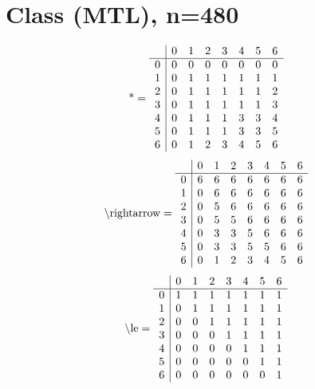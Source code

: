 \documentclass[11pt]{article}
\begin{document}
\section{Class (MTL), n=480}
\[\text{*} = 
\begin{array}{r | r r r r r r r}
 & 0 & 1 & 2 & 3 & 4 & 5 & 6 \\ \hline
0 & 0 & 0 & 0 & 0 & 0 & 0 & 0 \\
1 & 0 & 1 & 1 & 1 & 1 & 1 & 1 \\
2 & 0 & 1 & 1 & 1 & 1 & 1 & 2 \\
3 & 0 & 1 & 1 & 1 & 1 & 1 & 3 \\
4 & 0 & 1 & 1 & 1 & 3 & 3 & 4 \\
5 & 0 & 1 & 1 & 1 & 3 & 3 & 5 \\
6 & 0 & 1 & 2 & 3 & 4 & 5 & 6 \\
\end{array}
\]
\[\text{\textbackslash rightarrow} = 
\begin{array}{r | r r r r r r r}
 & 0 & 1 & 2 & 3 & 4 & 5 & 6 \\ \hline
0 & 6 & 6 & 6 & 6 & 6 & 6 & 6 \\
1 & 0 & 6 & 6 & 6 & 6 & 6 & 6 \\
2 & 0 & 5 & 6 & 6 & 6 & 6 & 6 \\
3 & 0 & 5 & 5 & 6 & 6 & 6 & 6 \\
4 & 0 & 3 & 3 & 5 & 6 & 6 & 6 \\
5 & 0 & 3 & 3 & 5 & 5 & 6 & 6 \\
6 & 0 & 1 & 2 & 3 & 4 & 5 & 6 \\
\end{array}
\]
\[\text{\textbackslash le} = 
\begin{array}{r | r r r r r r r}
 & 0 & 1 & 2 & 3 & 4 & 5 & 6 \\ \hline
0 & 1 & 1 & 1 & 1 & 1 & 1 & 1 \\
1 & 0 & 1 & 1 & 1 & 1 & 1 & 1 \\
2 & 0 & 0 & 1 & 1 & 1 & 1 & 1 \\
3 & 0 & 0 & 0 & 1 & 1 & 1 & 1 \\
4 & 0 & 0 & 0 & 0 & 1 & 1 & 1 \\
5 & 0 & 0 & 0 & 0 & 0 & 1 & 1 \\
6 & 0 & 0 & 0 & 0 & 0 & 0 & 1 \\
\end{array}
\]
\end{document}
